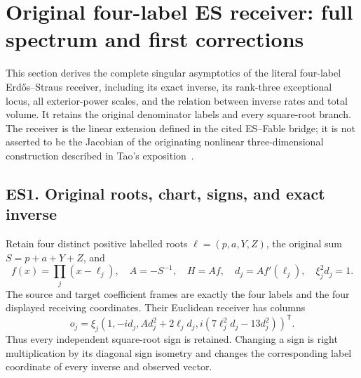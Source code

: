 \section{Original four-label ES receiver: full spectrum and first corrections}\label{original-four-label-es-receiver-full-spectrum-and-first-corrections}

This section derives the complete singular asymptotics of the literal
four-label Erd\H{o}s--Straus receiver, including its exact inverse, its
rank-three exceptional locus, all exterior-power scales, and the relation
between inverse rates and total volume.  It retains the original denominator
labels and every square-root branch.  The receiver is the linear extension
defined in the cited ES--Fable bridge; it is not asserted to be the Jacobian
of the originating nonlinear three-dimensional construction described in
Tao's exposition~\cite{TaoDigestion}.

\subsection{ES1. Original roots, chart, signs, and exact inverse}\label{es1.-original-roots-chart-signs-and-exact-inverse}

Retain four distinct positive labelled roots \(\ell=(p,a,Y,Z)\), the original sum \(S=p+a+Y+Z\), and \[
f(x)=\prod_j(x-\ell_j),\quad A=-S^{-1},\quad H=Af,\quad d_j=Af'(\ell_j),\quad \xi_j^2d_j=1.
\tag{ES1}
\] The source and target coefficient frames are exactly the four labels and the four displayed receiving coordinates. Their Euclidean receiver has columns \[
o_j=\xi_j(1,-id_j,Ad_j^2+2\ell_jd_j,i(7\ell_j^2d_j-13d_j^2))^{\mathsf T}.
\tag{ES2}
\] Thus every independent square-root sign is retained. Changing a sign is right multiplication by its diagonal sign isometry and changes the corresponding label coordinate of every inverse and observed vector.

